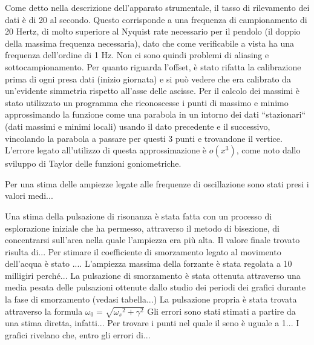 Come detto nella descrizione dell'apparato strumentale, il tasso di rilevamento dei dati è di 20 al secondo. Questo corrisponde a una
frequenza di campionamento di 20 Hertz, di molto superiore al 
Nyquist rate necessario per il pendolo (il doppio della massima frequenza
necessaria), dato che come verificabile a vista ha una frequenza dell'ordine di 1 Hz. 
Non ci sono quindi problemi di aliasing e sottocampionamento.
Per quanto riguarda l'offset, è stato rifatta la calibrazione prima di ogni presa dati (inizio giornata) e si può vedere che era
 calibrato da un'evidente simmetria rispetto all'asse delle ascisse.
Per il calcolo dei massimi è stato utilizzato un programma che riconoscesse i punti di massimo e minimo approssimando
la funzione come una parabola in un intorno dei dati ``stazionari`` (dati massimi e minimi locali) usando il dato precedente e il successivo,
vincolando la parabola a passare per questi 3 punti e trovandone il vertice. L'errore legato all'utilizzo
 di questa approssimazione è $o(x^3)$, come noto dallo sviluppo di Taylor delle funzioni goniometriche.

Per una stima delle ampiezze legate alle frequenze di oscillazione sono stati presi i valori medi...

Una stima della pulsazione di risonanza è stata fatta con un processo di esplorazione iniziale che ha permesso, attraverso
il metodo di bisezione, di concentrarsi sull'area nella quale l'ampiezza era più alta. Il valore finale trovato risulta di...
Per stimare il coefficiente di smorzamento legato al movimento dell'acqua è stato ....
L'ampiezza massima della forzante è stata regolata a 10 milligiri perché...
La pulsazione di smorzamento è stata ottenuta attraverso una media pesata delle pulsazioni ottenute dallo studio dei periodi dei
grafici durante la fase di smorzamento (vedasi tabella...)
La pulsazione propria è stata trovata attraverso la formula $\omega_0 =\sqrt{{\omega_s} ^ 2 + \gamma ^ 2 }$
Gli errori sono stati stimati a partire da una stima diretta, infatti...
Per trovare i punti nel quale il seno è uguale a 1...
I grafici rivelano che, entro gli errori di...
